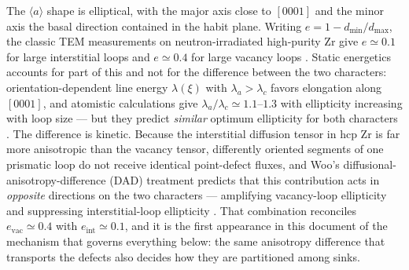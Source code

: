 \documentclass{article}
\newcommand{\aloop}{\ensuremath{\langle a\rangle}}
\begin{document}
The \aloop{} shape is elliptical, with the major axis close to $[0001]$ and the
minor axis the basal direction contained in the habit plane. Writing
$e=1-d_{\min}/d_{\max}$, the classic TEM measurements on neutron-irradiated
high-purity Zr give $e\simeq0.1$ for large interstitial loops and $e\simeq0.4$
for large vacancy loops \citep{jostsons1977nature}. Static energetics accounts
for part of this and not for the difference between the two characters:
orientation-dependent line energy $\lambda(\xi)$ with $\lambda_a>\lambda_c$
favors elongation along $[0001]$, and atomistic calculations give
$\lambda_a/\lambda_c\simeq1.1$--$1.3$ with ellipticity increasing with loop size
--- but they predict \emph{similar} optimum ellipticity for both characters
\citep{hulse2021atomistic}. The difference is kinetic. Because the interstitial
diffusion tensor in hcp Zr is far more anisotropic than the vacancy tensor,
differently oriented segments of one prismatic loop do not receive identical
point-defect fluxes, and Woo's diffusional-anisotropy-difference (DAD)
treatment predicts that this contribution acts in \emph{opposite} directions on
the two characters --- amplifying vacancy-loop ellipticity and suppressing
interstitial-loop ellipticity \citep{woo1988theory}. That combination reconciles
$e_{\mathrm{vac}}\simeq0.4$ with $e_{\mathrm{int}}\simeq0.1$, and it is the first
appearance in this document of the mechanism that governs everything below: the
same anisotropy difference that transports the defects also decides how they are
partitioned among sinks.
\end{document}
